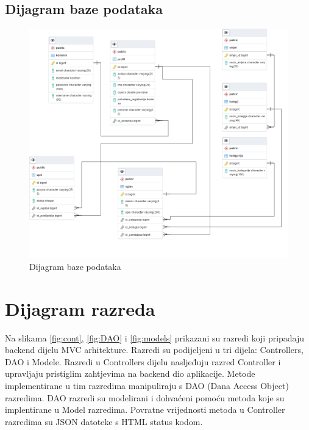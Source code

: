 			\eject
				
			\subsection{Dijagram baze podataka}
				
				\begin{figure}[H]
					\includegraphics[scale=0.6]{dijagrami/baza.png}
					\centering
					\caption{Dijagram baze podataka}
					\label{fig:dijagram baze}
				\end{figure}
				
			\eject
			
			
		\section{Dijagram razreda}
		
			Na slikama \ref{fig:cont}, \ref{fig:DAO} i \ref{fig:models} prikazani su razredi koji pripadaju backend dijelu MVC arhitekture. Razredi su podijeljeni u tri dijela: Controllers, DAO i Modele. Razredi u Controllers dijelu nasljeđuju razred Controller i upravljaju pristiglim zahtjevima na backend dio aplikacije. Metode implementirane u tim razredima manipuliraju s DAO (Dana Access Object) razredima. DAO razredi su modelirani i dohvaćeni pomoću metoda koje su implentirane u Model razredima. Povratne vrijednosti metoda u Controller razredima su JSON datoteke s HTML status kodom.
			
